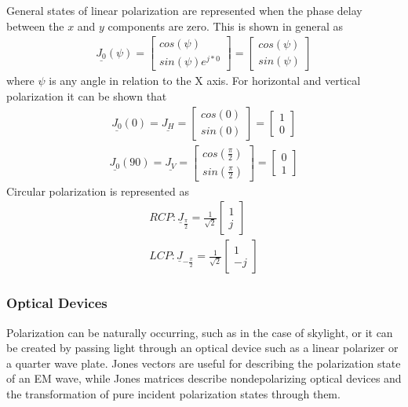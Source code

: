 %
General states of linear polarization are represented when the phase delay between the $x$ and $y$ components are zero. This is shown in general as
%
\begin{align}
    \underline{J_0}(\psi) =
    \begin{bmatrix}
        cos(\psi) \\
        sin(\psi)e^{j*0}
    \end{bmatrix}
    =
    \begin{bmatrix}
        cos(\psi) \\
        sin(\psi)
    \end{bmatrix}
\end{align}
%
where $\psi$ is any angle in relation to the X axis. For horizontal and vertical polarization it can be shown that
%
\begin{align}
    \underline{J_0}(0) = \underline{J_H} =
    \begin{bmatrix}
        cos(0) \\
        sin(0)
    \end{bmatrix}
    =
    \begin{bmatrix}
        1 \\
        0
    \end{bmatrix}
\end{align}
\begin{align}
    \underline{J_0}(90) = \underline{J_V} =
    \begin{bmatrix}
        cos(\frac{\pi}{2}) \\
        sin(\frac{\pi}{2})
    \end{bmatrix}
    =
    \begin{bmatrix}
        0 \\
        1
    \end{bmatrix}
\end{align}
Circular polarization is represented as
%
\begin{align}
    RCP: \underline{J}_{\frac{\pi}{2}} = \frac{1}{\sqrt{2}}
    \begin{bmatrix}
        1 \\
        j
    \end{bmatrix} \\
    LCP: \underline{J}_{-\frac{\pi}{2}} = \frac{1}{\sqrt{2}}
    \begin{bmatrix}
        1 \\
        -j
    \end{bmatrix}
\end{align}
%
\subsubsection{Optical Devices}
Polarization can be naturally occurring, such as in the case of skylight, or it can be created by passing light through an optical device such as a linear polarizer or a quarter wave plate.  Jones vectors are useful for describing the polarization state of an EM wave, while Jones matrices describe nondepolarizing optical devices and the transformation of pure incident polarization states through them.

